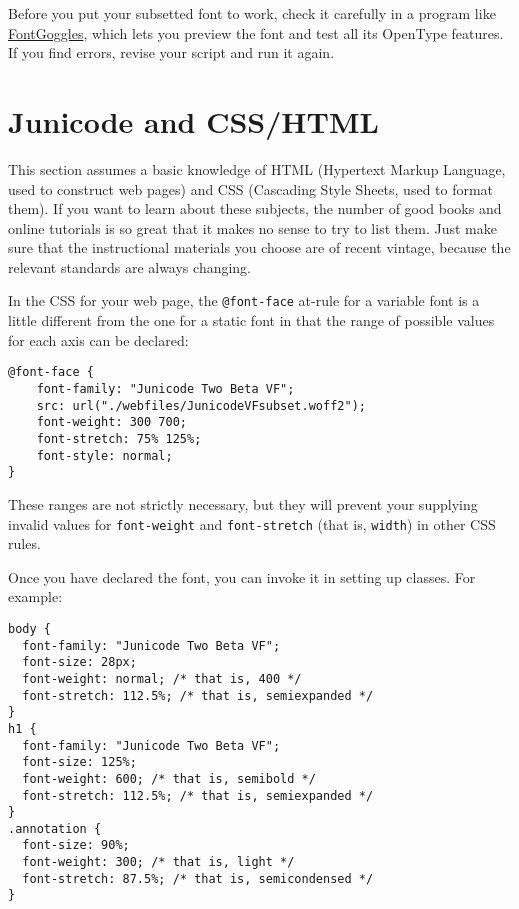 \documentclass[12pt,letterpaper,openany]{book}
\begin{document}
Before you put your subsetted font to work, check it carefully in a program
like \href{https://github.com/justvanrossum/fontgoggles}{FontGoggles},
which lets you preview the font and test all its OpenType features. If you
find errors, revise your script and run it again.

\section{Junicode and CSS/HTML}

This section assumes a basic knowledge of HTML (Hypertext Markup Language, used
to construct web pages) and CSS (Cascading Style Sheets, used to format them).
If you want to learn about these subjects, the number of good books and online
tutorials is so great that it makes no sense to try to list them. Just make sure
that the instructional materials you choose are of recent vintage, because the
relevant standards are always changing.

In the CSS for your web page, the \texttt{@font-face} at-rule for a variable
font is a little different
from the one for a static font in that the range of possible values for each
axis can be declared:

\small\begin{verbatim}
@font-face {
    font-family: "Junicode Two Beta VF";
    src: url("./webfiles/JunicodeVFsubset.woff2");
    font-weight: 300 700;
    font-stretch: 75% 125%;
    font-style: normal;
}
\end{verbatim}

\normalsize\noindent These ranges are not strictly necessary, but they will prevent your
supplying invalid values for \texttt{font-weight} and \texttt{font-stretch}
(that is, \texttt{width}) in other CSS rules.

Once you have declared the font, you can invoke it in setting up classes.
For example:

\small\begin{verbatim}
body {
  font-family: "Junicode Two Beta VF";
  font-size: 28px;
  font-weight: normal; /* that is, 400 */
  font-stretch: 112.5%; /* that is, semiexpanded */
}
h1 {
  font-family: "Junicode Two Beta VF";
  font-size: 125%;
  font-weight: 600; /* that is, semibold */
  font-stretch: 112.5%; /* that is, semiexpanded */
}
.annotation {
  font-size: 90%;
  font-weight: 300; /* that is, light */
  font-stretch: 87.5%; /* that is, semicondensed */
}
\end{verbatim}
\end{document}

